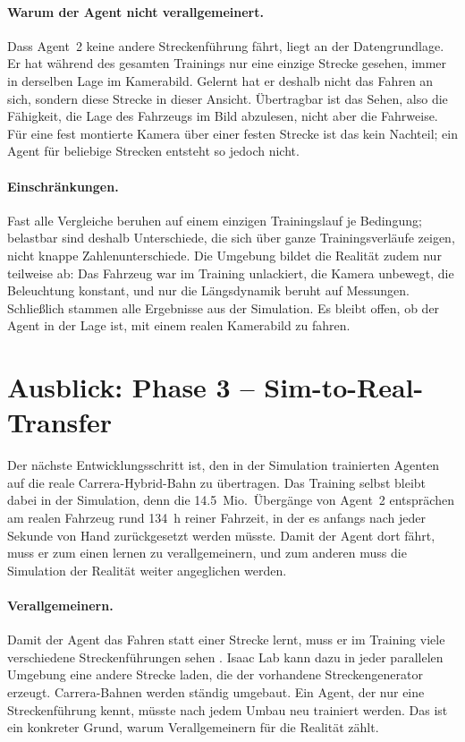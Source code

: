 \paragraph{Warum der Agent nicht verallgemeinert.}
Dass Agent~2 keine andere Streckenführung fährt, liegt an der Datengrundlage. Er hat während des gesamten Trainings nur eine einzige Strecke gesehen, immer in derselben Lage im Kamerabild. Gelernt hat er deshalb nicht das Fahren an sich, sondern diese Strecke in dieser Ansicht. Übertragbar ist das Sehen, also die Fähigkeit, die Lage des Fahrzeugs im Bild abzulesen, nicht aber die Fahrweise. Für eine fest montierte Kamera über einer festen Strecke ist das kein Nachteil; ein Agent für beliebige Strecken entsteht so jedoch nicht.

\paragraph{Einschränkungen.}
Fast alle Vergleiche beruhen auf einem einzigen Trainingslauf je Bedingung; belastbar sind deshalb Unterschiede, die sich über ganze Trainingsverläufe zeigen, nicht knappe Zahlenunterschiede. Die Umgebung bildet die Realität zudem nur teilweise ab: Das Fahrzeug war im Training unlackiert, die Kamera unbewegt, die Beleuchtung konstant, und nur die Längsdynamik beruht auf Messungen. Schließlich stammen alle Ergebnisse aus der Simulation. Es bleibt offen, ob der Agent in der Lage ist, mit einem realen Kamerabild zu fahren.

\section{Ausblick: Phase 3 -- Sim-to-Real-Transfer}
\label{sec:ausblick}

Der nächste Entwicklungsschritt ist, den in der Simulation trainierten Agenten auf die reale Carrera-Hybrid-Bahn zu übertragen. Das Training selbst bleibt dabei in der Simulation, denn die \num{14.5}~Mio.\ Übergänge von Agent~2 entsprächen am realen Fahrzeug rund \SI{134}{\hour} reiner Fahrzeit, in der es anfangs nach jeder Sekunde von Hand zurückgesetzt werden müsste. Damit der Agent dort fährt, muss er zum einen lernen zu verallgemeinern, und zum anderen muss die Simulation der Realität weiter angeglichen werden.

\paragraph{Verallgemeinern.}
Damit der Agent das Fahren statt einer Strecke lernt, muss er im Training viele verschiedene Streckenführungen sehen \cite{cobbe2019quantifying}. Isaac Lab kann dazu in jeder parallelen Umgebung eine andere Strecke laden, die der vorhandene Streckengenerator erzeugt. Carrera-Bahnen werden ständig umgebaut. Ein Agent, der nur eine Streckenführung kennt, müsste nach jedem Umbau neu trainiert werden. Das ist ein konkreter Grund, warum Verallgemeinern für die Realität zählt.

